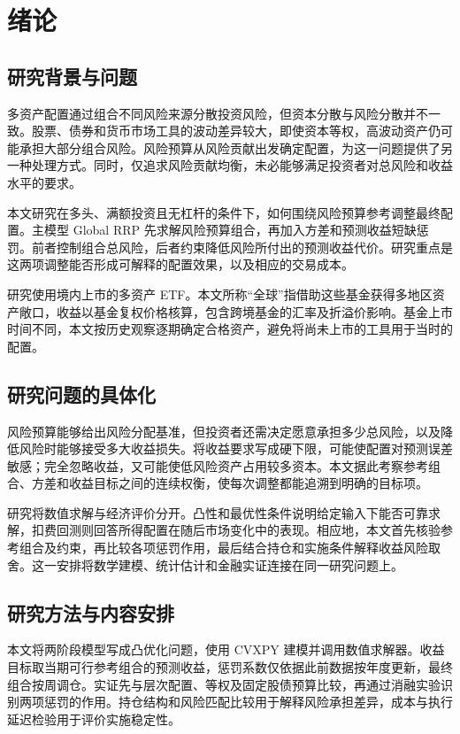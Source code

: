 \section{绪论}
\subsection{研究背景与问题}
多资产配置通过组合不同风险来源分散投资风险，但资本分散与风险分散并不一致。股票、债券和货币市场工具的波动差异较大，即使资本等权，高波动资产仍可能承担大部分组合风险。风险预算从风险贡献出发确定配置，为这一问题提供了另一种处理方式。同时，仅追求风险贡献均衡，未必能够满足投资者对总风险和收益水平的要求。

本文研究在多头、满额投资且无杠杆的条件下，如何围绕风险预算参考调整最终配置。主模型 Global RRP 先求解风险预算组合，再加入方差和预测收益短缺惩罚。前者控制组合总风险，后者约束降低风险所付出的预测收益代价。研究重点是这两项调整能否形成可解释的配置效果，以及相应的交易成本。

研究使用境内上市的多资产 ETF。本文所称“全球”指借助这些基金获得多地区资产敞口，收益以基金复权价格核算，包含跨境基金的汇率及折溢价影响。基金上市时间不同，本文按历史观察逐期确定合格资产，避免将尚未上市的工具用于当时的配置。

\subsection{研究问题的具体化}
风险预算能够给出风险分配基准，但投资者还需决定愿意承担多少总风险，以及降低风险时能够接受多大收益损失。将收益要求写成硬下限，可能使配置对预测误差敏感；完全忽略收益，又可能使低风险资产占用较多资本。本文据此考察参考组合、方差和收益目标之间的连续权衡，使每次调整都能追溯到明确的目标项。

研究将数值求解与经济评价分开。凸性和最优性条件说明给定输入下能否可靠求解，扣费回测则回答所得配置在随后市场变化中的表现。相应地，本文首先核验参考组合及约束，再比较各项惩罚作用，最后结合持仓和实施条件解释收益风险取舍。这一安排将数学建模、统计估计和金融实证连接在同一研究问题上。

\subsection{研究方法与内容安排}
本文将两阶段模型写成凸优化问题，使用 CVXPY 建模并调用数值求解器。收益目标取当期可行参考组合的预测收益，惩罚系数仅依据此前数据按年度更新，最终组合按周调仓。实证先与层次配置、等权及固定股债预算比较，再通过消融实验识别两项惩罚的作用。持仓结构和风险匹配比较用于解释风险承担差异，成本与执行延迟检验用于评价实施稳定性。

